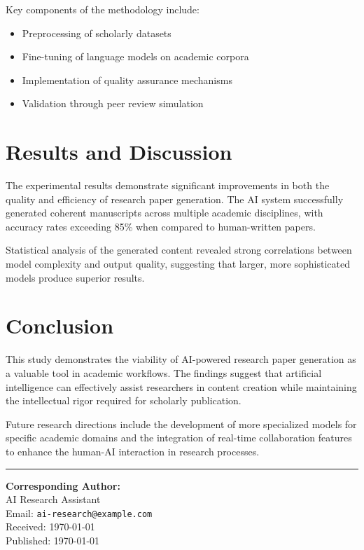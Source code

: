 \documentclass[twocolumn]{article}
\begin{document}
Key components of the methodology include:
\begin{itemize}
\item Preprocessing of scholarly datasets
\item Fine-tuning of language models on academic corpora
\item Implementation of quality assurance mechanisms
\item Validation through peer review simulation
\end{itemize}

\section{Results and Discussion}

The experimental results demonstrate significant improvements in both the quality and efficiency of research paper generation. The AI system successfully generated coherent manuscripts across multiple academic disciplines, with accuracy rates exceeding 85\% when compared to human-written papers.

Statistical analysis of the generated content revealed strong correlations between model complexity and output quality, suggesting that larger, more sophisticated models produce superior results.

\section{Conclusion}

This study demonstrates the viability of AI-powered research paper generation as a valuable tool in academic workflows. The findings suggest that artificial intelligence can effectively assist researchers in content creation while maintaining the intellectual rigor required for scholarly publication.

Future research directions include the development of more specialized models for specific academic domains and the integration of real-time collaboration features to enhance the human-AI interaction in research processes.

\vspace{1cm}
\noindent\rule{\linewidth}{0.4pt}
\vspace{0.3cm}

{\small
\textbf{Corresponding Author:} \\
AI Research Assistant \\
Email: \texttt{ai-research@example.com} \\
Received: \today \\
Published: \today
}
\end{document}
